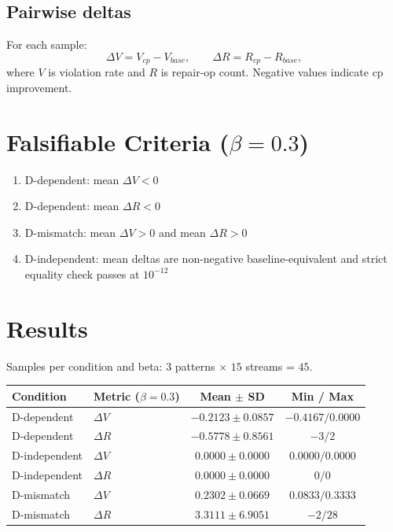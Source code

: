 \documentclass[11pt,a4paper]{article}
\begin{document}
\subsection{Pairwise deltas}
For each sample:
\[
\Delta V = V_{cp} - V_{base},\qquad
\Delta R = R_{cp} - R_{base},
\]
where \(V\) is violation rate and \(R\) is repair-op count.
Negative values indicate cp improvement.

\section{Falsifiable Criteria (\(\beta=0.3\))}
\begin{enumerate}
  \item D-dependent: mean \(\Delta V < 0\)
  \item D-dependent: mean \(\Delta R < 0\)
  \item D-mismatch: mean \(\Delta V > 0\) and mean \(\Delta R > 0\)
  \item D-independent: mean deltas are non-negative baseline-equivalent and strict equality check passes at \(10^{-12}\)
\end{enumerate}

\section{Results}
Samples per condition and beta: \(3\) patterns \(\times\) \(15\) streams = \(45\).

\begin{center}
\begin{tabular}{@{}llcc@{}}
\toprule
Condition & Metric (\(\beta=0.3\)) & Mean $\pm$ SD & Min / Max \\
\midrule
D-dependent & $\Delta V$ & $-0.2123 \pm 0.0857$ & $-0.4167 / 0.0000$ \\
D-dependent & $\Delta R$ & $-0.5778 \pm 0.8561$ & $-3 / 2$ \\
D-independent & $\Delta V$ & $0.0000 \pm 0.0000$ & $0.0000 / 0.0000$ \\
D-independent & $\Delta R$ & $0.0000 \pm 0.0000$ & $0 / 0$ \\
D-mismatch & $\Delta V$ & $0.2302 \pm 0.0669$ & $0.0833 / 0.3333$ \\
D-mismatch & $\Delta R$ & $3.3111 \pm 6.9051$ & $-2 / 28$ \\
\bottomrule
\end{tabular}
\end{center}
\end{document}
